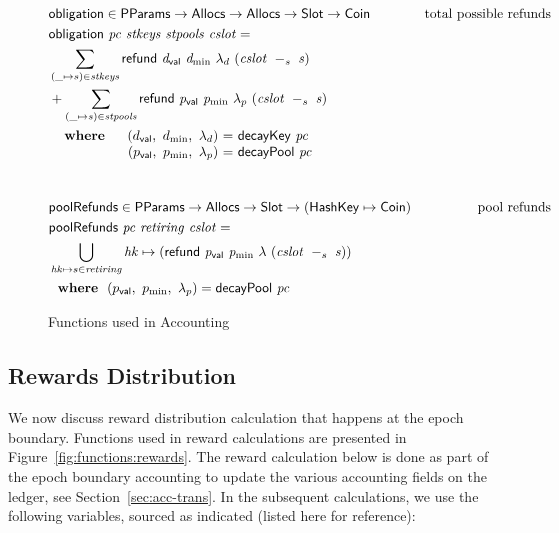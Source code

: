 \begin{figure}[htb]
  \begin{align*}
      & \fun{obligation} \in \PParams \to \Allocs \to \Allocs \to \Slot \to \Coin
      & \text{total possible refunds} \\
      & \obligation{pc}{stkeys}{stpools}{cslot} =\\
      & \sum\limits_{(\_ \mapsto s) \in \var{stkeys}}
        \refund{d_{\mathsf{val}}}{d_{\min}}{\lambda_d}{(\slotminus{cslot}{s})} \\
      & + \sum\limits_{(\_ \mapsto s) \in \var{stpools}}
        \refund{p_{\mathsf{val}}}{p_{\min}}{\lambda_p}{(\slotminus{cslot}{s})} \\
      &
      \begin{array}{lr@{~=~}l}
        \where
          & (\dval,~d_{\min},~\lambda_d) & \fun{decayKey}~\var{pc}\\
          & (p_{\mathsf{val}},~p_{\min},~\lambda_p) & \fun{decayPool}~\var{pc}\\
      \end{array}\\
      \nextdef
      & \fun{poolRefunds} \in \PParams \to \Allocs \to \Slot \to (\HashKey \mapsto \Coin)
      & \text{pool refunds} \\
      & \poolRefunds{pc}{retiring}{cslot} = \\
      & \bigcup_{\var{hk}\mapsto s\in\var{retiring}}
          \var{hk}\mapsto( \refund{p_{\mathsf{val}}}{p_{\min}}{\lambda}{(\slotminus{cslot}{s})} ) \\
      &
        \where (p_{\mathsf{val}},~p_{\min},~\lambda_p) = \fun{decayPool}~\var{pc}\\
  \end{align*}
  \caption{Functions used in Accounting}
  \label{fig:functions:epoch}
\end{figure}

\subsection{Rewards Distribution}
\label{sec:reward-dist}

We now discuss reward distribution calculation that happens at the epoch boundary.
Functions used in reward calculations are presented in
Figure~\ref{fig:functions:rewards}. The reward calculation below is done as part of the
epoch boundary accounting to update the various accounting fields on the ledger,
see Section~\ref{sec:acc-trans}. In the subsequent calculations, we use the
following variables, sourced as indicated (listed here for reference):

